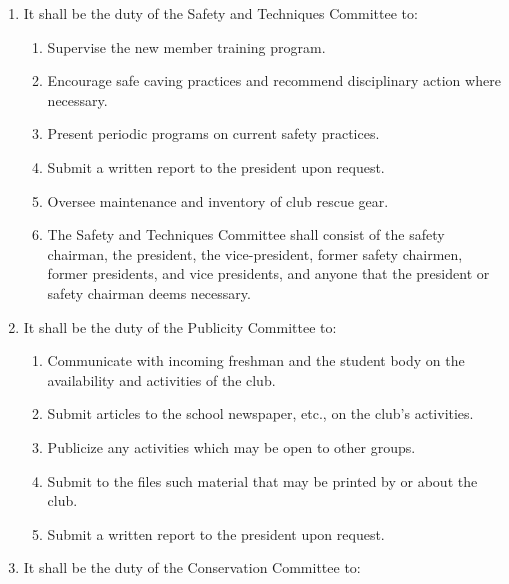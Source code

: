 \documentclass[
]{article}
\providecommand{\tightlist}{%
  \setlength{\itemsep}{0pt}\setlength{\parskip}{0pt}}
\begin{document}
\begin{enumerate}
\def\labelenumi{\arabic{enumi}.}
\tightlist
\item
  It shall be the duty of the Safety and Techniques Committee to:

  \begin{enumerate}
  \def\labelenumii{\Alph{enumii}.}
  \tightlist
  \item
    Supervise the new member training program.
  \item
    Encourage safe caving practices and recommend disciplinary action
    where necessary.
  \item
    Present periodic programs on current safety practices.
  \item
    Submit a written report to the president upon request.
  \item
    Oversee maintenance and inventory of club rescue gear.
  \item
    The Safety and Techniques Committee shall consist of the safety
    chairman, the president, the vice-president, former safety chairmen,
    former presidents, and vice presidents, and anyone that the
    president or safety chairman deems necessary.
  \end{enumerate}
\item
  It shall be the duty of the Publicity Committee to:

  \begin{enumerate}
  \def\labelenumii{\Alph{enumii}.}
  \tightlist
  \item
    Communicate with incoming freshman and the student body on the
    availability and activities of the club.
  \item
    Submit articles to the school newspaper, etc., on the club's
    activities.
  \item
    Publicize any activities which may be open to other groups.
  \item
    Submit to the files such material that may be printed by or about
    the club.
  \item
    Submit a written report to the president upon request.
  \end{enumerate}
\item
  It shall be the duty of the Conservation Committee to:


\end{enumerate}
\end{document}
